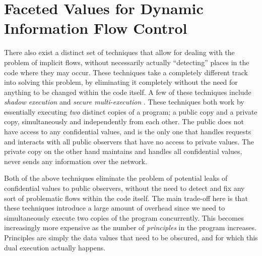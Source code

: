 \documentclass[preprint]{sigplanconf}
\begin{document}
\section{Faceted Values for Dynamic Information Flow Control}
\label{sec:3}
There also exist a distinct set of techniques that allow for dealing with the problem of implicit flows, without necessarily actually ``detecting'' places in the code where they may occur. These techniques take a completely different track into solving this problem, by eliminating it completely without the need for anything to be changed within the code itself. A few of these techniques include \textit{shadow execution} and \textit{secure multi-execution} \cite{capizzi2008preventing, devriese2010noninterference}. These techniques both work by essentially executing \textit{two} distinct copies of a program; a public copy and a private copy, simultaneously and independently from each other. The public does not have access to any confidential values, and is the only one that handles requests and interacts with all public observers that have no access to private values. The private copy on the other hand maintains and handles all confidential values, never sends any information over the network. %

Both of the above techniques eliminate the problem of potential leaks of confidential values to public observers, without the need to detect and fix any sort of problematic flows within the code itself. The main trade-off here is that these techniques introduce a large amount of overhead since we need to simultaneously execute two copies of the program concurrently. This becomes increasingly more expensive as the number of \textit{principles} in the program increases. Principles are simply the data values that need to be obscured, and for which this dual execution actually happens.
\end{document}
